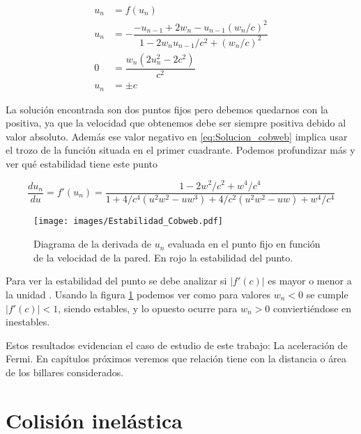 \begin{align}
    u_n &= f(u_n) \nonumber\\
    u_n &= -\dfrac{-u_{n-1} + 2w_n - u_{n-1}(w_n/c)^2}{1 - 2w_n u_{n-1}/c^2 + (w_n/c)^2}\label{eq:Solucion_cobweb} \\
    0 &= \dfrac{w_n\left( 2u_n^2-2c^2 \right)}{c^2} \nonumber\\
    u_n &= \pm c \label{eq:Solucion_cobweb,valor}
\end{align}

\vspace{3mm}

La solución encontrada son dos puntos fijos pero debemos quedarnos con la positiva, ya que la velocidad que obtenemos debe ser siempre positiva debido al valor absoluto. Además ese valor negativo en \ref{eq:Solucion_cobweb} implica usar el trozo de la función situada en el primer cuadrante. Podemos profundizar más y ver qué estabilidad tiene este punto

\begin{equation}
    \dfrac{du_n}{du} = f'(u_n) = \dfrac{1 - 2w^2/c^2 + w^4/c^4}{1 + 4/c^4\left( u^2w^2-uw^3 \right) + 4/c^2\left( u^2w^2-uw \right) + w^4/c^4}
\end{equation}

\begin{figure}[H]
    \centering
    \texttt{[image: images/Estabilidad\_Cobweb.pdf]}
    \caption{Diagrama de la derivada de $u_n$ evaluada en el punto fijo en función de la velocidad de la pared. En rojo la estabilidad del punto.}
    \label{fig:estabilidad_cobweb}
\end{figure}

\vspace{3mm}

Para ver la estabilidad del punto se debe analizar si \( \left| f'(c) \right| \) es mayor o menor a la unidad \cite{Strogatz}. Usando la figura \ref{fig:estabilidad_cobweb} podemos ver como para valores \( w_n < 0 \) se cumple \( \left| f'(c) \right| < 1 \), siendo estables, y lo opuesto ocurre para \( w_n > 0 \) conviertiéndose en inestables.

\vspace{3mm}

Estos resultados evidencian el caso de estudio de este trabajo: La aceleración de Fermi. En capítulos próximos veremos que relación tiene con la distancia o área de los billares considerados.

\section{Colisión inelástica}

